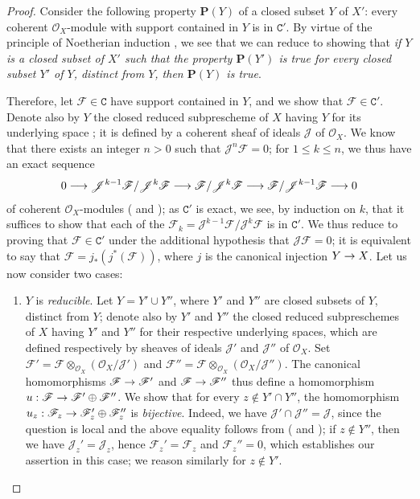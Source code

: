\documentclass[oneside]{amsart}
\theoremstyle{ega-env-style}
\theoremstyle{ega-thm-env-style}
\theoremstyle{ega-defn-env-style}
\def\mathcal{\mathscr}
\def\sh{\mathcal}                   %
\def\cat{\mathtt}                   %
\def\leq{\leqslant}                 %
\def\C{\cat{C}}                     %
\renewcommand{\to}{\mathchoice{\longrightarrow}{\rightarrow}{\rightarrow}{\rightarrow}}
\newcommand{\oldpage}[2][]{{\marginnote{\normalfont{\textbf{#1}~|~#2}}}\ignorespaces}
\begin{document}
\begin{proof}
Consider the following property $\textbf{P}(Y)$ of a closed subset $Y$ of $X'$: every coherent $\sh{O}_X$-module with support contained in $Y$ is in $\C'$.
By virtue of the principle of Noetherian induction , we see that we can reduce to showing that \emph{if $Y$ is a closed subset of $X'$ such that the property $\textbf{P}(Y')$ is true for every closed subset $Y'$ of $Y$, distinct from $Y$, then $\textbf{P}(Y)$ is true}.

Therefore, let $\sh{F}\in\C$ have support contained in $Y$, and we show that $\sh{F}\in\C'$.
Denote also by $Y$ the closed reduced subprescheme of $X$ having $Y$ for its underlying space ; it is defined by a coherent sheaf of ideals $\sh{J}$ of $\sh{O}_X$.
We know  that there exists an integer $n>0$ such that $\sh{J}^n\sh{F}=0$; for $1\leq k\leq n$, we thus have an exact sequence
\[
  0\to\sh{J}^{k-1}\sh{F}/\sh{J}^k\sh{F}\to\sh{F}/\sh{J}^k\sh{F}\to\sh{F}/\sh{J}^{k-1}\sh{F}\to 0
\]
 of coherent $\sh{O}_X$-modules ( and ); as $\C'$ is exact, we see, by induction on $k$, that it suffices to show that each of the $\sh{F}_k=\sh{J}^{k-1}\sh{F}/\sh{J}^k\sh{F}$ is in $\C'$.
We thus reduce to proving that $\sh{F}\in\C'$ under the additional hypothesis that $\sh{J}\sh{F}=0$; it is equivalent to say that $\sh{F}=j_*(j^*(\sh{F}))$, where $j$ is the canonical injection $Y\to X$.
Let us now consider two cases:
\begin{enumerate}
  \item[(a)] $Y$ is \emph{reducible}.
    Let $Y=Y'\cup Y''$, where $Y'$ and $Y''$ are closed subsets of $Y$, distinct from $Y$; denote also by $Y'$ and $Y''$ the closed reduced subpreschemes of $X$ having $Y'$ and $Y''$ for their respective underlying spaces, which are defined respectively by sheaves of ideals $\sh{J}'$ and $\sh{J}''$ of $\sh{O}_X$.
    Set $\sh{F}'=\sh{F}\otimes_{\sh{O}_X}(\sh{O}_X/\sh{J}')$ and $\sh{F}''=\sh{F}\otimes_{\sh{O}_X}(\sh{O}_X/\sh{J}'')$.
    The canonical homomorphisms $\sh{F}\to\sh{F}'$ and $\sh{F}\to\sh{F}''$ thus define a homomorphism $u:\sh{F}\to\sh{F}'\oplus\sh{F}''$.
    We show that for every $z\not\in Y'\cap Y''$, the homomorphism $u_z:\sh{F}_z\to\sh{F}_z'\oplus\sh{F}_z''$ is \emph{bijective}.
    Indeed, we have $\sh{J}'\cap\sh{J}''=\sh{J}$, since the question is local and
\oldpage[III]{116}
    the above equality follows from ( and ); if $z\not\in Y''$, then we have $\sh{J}_z'=\sh{J}_z$, hence $\sh{F}_z'=\sh{F}_z$ and $\sh{F}_z''=0$, which establishes our assertion in this case; we reason similarly for $z\not\in Y'$.

\end{enumerate}
\end{proof}
\end{document}
